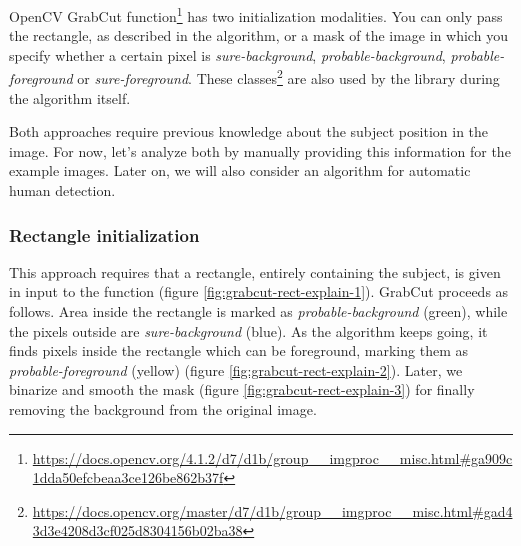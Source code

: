 OpenCV GrabCut function\footnote{\url{https://docs.opencv.org/4.1.2/d7/d1b/group__imgproc__misc.html\#ga909c1dda50efcbeaa3ce126be862b37f}} has two initialization modalities. You can only pass the rectangle, as described in the algorithm, or a mask of the image in which you specify whether a certain pixel is \textit{sure-background}, \textit{probable-background}, \textit{probable-foreground} or \textit{sure-foreground}. These classes\footnote{\url{https://docs.opencv.org/master/d7/d1b/group__imgproc__misc.html\#gad43d3e4208d3cf025d8304156b02ba38}} are also used by the library during the algorithm itself. 

\medskip

Both approaches require previous knowledge about the subject position in the image. For now, let’s analyze both by manually providing this information for the example images. Later on, we will also consider an algorithm for automatic human detection.


\subsubsection{Rectangle initialization}
\label{subsec:masking-grabcut-rect}

This approach requires that a rectangle, entirely containing the subject, is given in input to the function (figure \ref{fig:grabcut-rect-explain-1}). GrabCut proceeds as follows. Area inside the rectangle is marked as \textit{probable-background} (green), while the pixels outside are \textit{sure-background} (blue). As the algorithm keeps going, it finds pixels inside the rectangle which can be foreground, marking them as \textit{probable-foreground} (yellow) (figure \ref{fig:grabcut-rect-explain-2}). Later, we binarize and smooth the mask (figure \ref{fig:grabcut-rect-explain-3}) for finally removing the background from the original image.

